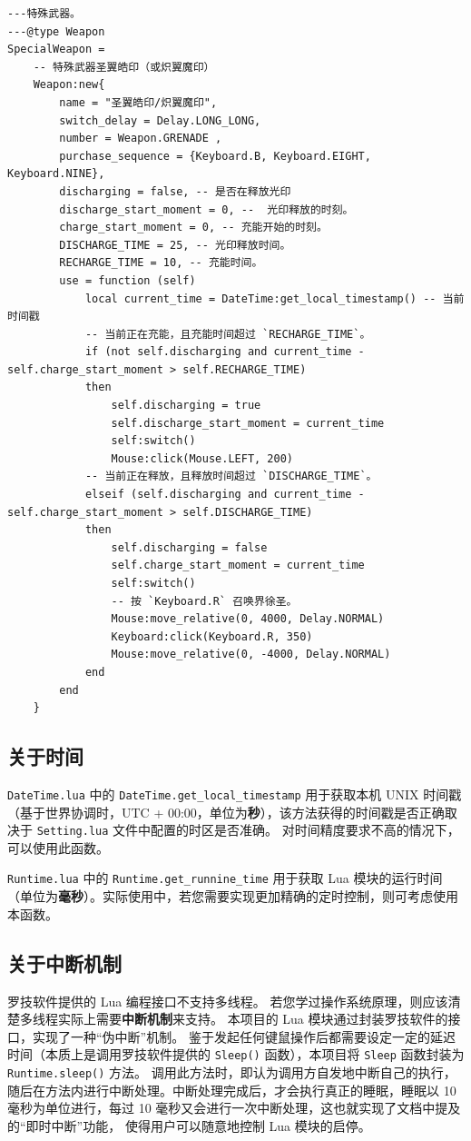 \begin{verbatim}
---特殊武器。
---@type Weapon
SpecialWeapon =
    -- 特殊武器圣翼皓印（或炽翼魔印）
    Weapon:new{
        name = "圣翼皓印/炽翼魔印",
        switch_delay = Delay.LONG_LONG,
        number = Weapon.GRENADE ,
        purchase_sequence = {Keyboard.B, Keyboard.EIGHT, Keyboard.NINE},
        discharging = false, -- 是否在释放光印
        discharge_start_moment = 0, --  光印释放的时刻。
        charge_start_moment = 0, -- 充能开始的时刻。
        DISCHARGE_TIME = 25, -- 光印释放时间。
        RECHARGE_TIME = 10, -- 充能时间。
        use = function (self)
            local current_time = DateTime:get_local_timestamp() -- 当前时间戳
            -- 当前正在充能，且充能时间超过 `RECHARGE_TIME`。
            if (not self.discharging and current_time - self.charge_start_moment > self.RECHARGE_TIME)
            then
                self.discharging = true
                self.discharge_start_moment = current_time
                self:switch()
                Mouse:click(Mouse.LEFT, 200)
            -- 当前正在释放，且释放时间超过 `DISCHARGE_TIME`。
            elseif (self.discharging and current_time - self.charge_start_moment > self.DISCHARGE_TIME)
            then
                self.discharging = false
                self.charge_start_moment = current_time
                self:switch()
                -- 按 `Keyboard.R` 召唤界徐圣。 
                Mouse:move_relative(0, 4000, Delay.NORMAL)
                Keyboard:click(Keyboard.R, 350)
                Mouse:move_relative(0, -4000, Delay.NORMAL)
            end
        end
    }\end{verbatim}

\subsection{关于时间}

\lstinline{DateTime.lua} 中的 \lstinline{DateTime.get_local_timestamp} 用于获取本机 UNIX 时间戳（基于世界协调时，UTC + 00:00，单位为\textbf{秒}），该方法获得的时间戳是否正确取决于 \lstinline{Setting.lua} 文件中配置的时区是否准确。
对时间精度要求不高的情况下，可以使用此函数。

\lstinline{Runtime.lua} 中的 \lstinline{Runtime.get_runnine_time} 用于获取 Lua 模块的运行时间（单位为\textbf{毫秒}）。实际使用中，若您需要实现更加精确的定时控制，则可考虑使用本函数。

\subsection{关于中断机制}

罗技软件提供的 Lua 编程接口不支持多线程。
若您学过操作系统原理，则应该清楚多线程实际上需要\textbf{中断机制}来支持。
本项目的 Lua 模块通过封装罗技软件的接口，实现了一种“伪中断”机制。
鉴于发起任何键鼠操作后都需要设定一定的延迟时间（本质上是调用罗技软件提供的 \lstinline{Sleep()} 函数），本项目将 \lstinline{Sleep} 函数封装为 \lstinline{Runtime.sleep()} 方法。
调用此方法时，即认为调用方自发地中断自己的执行，随后在方法内进行中断处理。中断处理完成后，才会执行真正的睡眠，睡眠以 10 毫秒为单位进行，每过 10 毫秒又会进行一次中断处理，这也就实现了文档中提及的“即时中断”功能，
使得用户可以随意地控制 Lua 模块的启停。